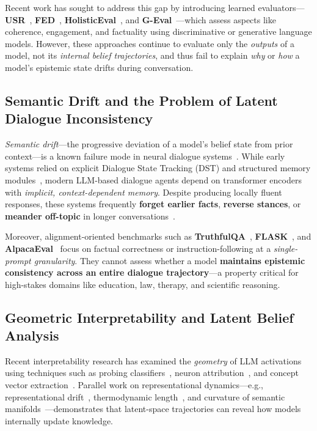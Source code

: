 \documentclass[11pt]{article}
\begin{document}
Recent work has sought to address this gap by introducing learned evaluators—\textbf{USR}~\cite{mehri2020usr}, \textbf{FED}~\cite{mehri2020unsupervised}, \textbf{HolisticEval}~\cite{pang2020towards}, and \textbf{G-Eval}~\cite{liu2023geval}—which assess aspects like coherence, engagement, and factuality using discriminative or generative language models. However, these approaches continue to evaluate only the \emph{outputs} of a model, not its \emph{internal belief trajectories}, and thus fail to explain \emph{why} or \emph{how} a model's epistemic state drifts during conversation.

\subsection{Semantic Drift and the Problem of Latent Dialogue Inconsistency}

\emph{Semantic drift}—the progressive deviation of a model’s belief state from prior context—is a known failure mode in neural dialogue systems~\cite{xu2022semantic}. While early systems relied on explicit Dialogue State Tracking (DST) and structured memory modules~\cite{serban2016building, heck2020trippy}, modern LLM-based dialogue agents depend on transformer encoders with \emph{implicit, context-dependent memory}. Despite producing locally fluent responses, these systems frequently \textbf{forget earlier facts}, \textbf{reverse stances}, or \textbf{meander off-topic} in longer conversations~\cite{zhang2020retrospective, gupta2021history}.

Moreover, alignment-oriented benchmarks such as \textbf{TruthfulQA}~\cite{lin2022truthfulqa}, \textbf{FLASK}~\cite{lee2023flask}, and \textbf{AlpacaEval}~\cite{alpacaeval2023} focus on factual correctness or instruction-following at a \emph{single-prompt granularity}. They cannot assess whether a model \textbf{maintains epistemic consistency across an entire dialogue trajectory}—a property critical for high-stakes domains like education, law, therapy, and scientific reasoning.

\subsection{Geometric Interpretability and Latent Belief Analysis}

Recent interpretability research has examined the \emph{geometry} of LLM activations using techniques such as probing classifiers~\cite{hewitt2019structural}, neuron attribution~\cite{meng2022locating}, and concept vector extraction~\cite{gurnee2023lmexplainer}. Parallel work on representational dynamics—e.g., representational drift~\cite{mirzadeh2022revisiting}, thermodynamic length~\cite{li2019measuring}, and curvature of semantic manifolds~\cite{garg2022what}—demonstrates that latent-space trajectories can reveal how models internally update knowledge.
\end{document}
